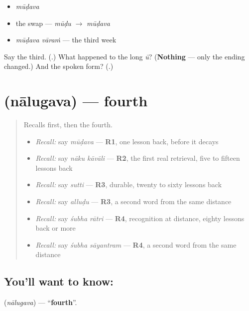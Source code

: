\begin{itemize}
\raggedright
  \item \emph{mūḍava}
  \item the swap — \emph{mūḍu} $\to$ \emph{mūḍava}
  \item \emph{mūḍava vāraṁ} — the third week
\end{itemize}

\begin{tcolorbox}[breakable,colback=teal!4,colframe=teal!35!black,title={Before you move on}]
Say the third. (\textbf{}.) What happened to the long \emph{ū}? (\textbf{Nothing} — only the ending changed.) And the spoken form? (\textbf{}.)
\end{tcolorbox}
\section[\texorpdfstring{\te{నాలుగవ} (nālugava)}{నాలుగవ (nālugava)}]{ (nālugava) — fourth}

\label{lesson:TE-C81-fourth}



\begin{quote}
Recalls first, then the fourth.

\begin{itemize}
\raggedright
  \item \emph{Recall:} say \emph{mūḍava} — \textbf{R1}, one lesson back, before it decays
  \item \emph{Recall:} say \emph{nāku kāvāli} — \textbf{R2}, the first real retrieval, five to fifteen lessons back
  \item \emph{Recall:} say \emph{sutti} — \textbf{R3}, durable, twenty to sixty lessons back
  \item \emph{Recall:} say \emph{alluḍu} — \textbf{R3}, a second word from the same distance
  \item \emph{Recall:} say \emph{śubha rātri} — \textbf{R4}, recognition at distance, eighty lessons back or more
  \item \emph{Recall:} say \emph{śubha sāyantram} — \textbf{R4}, a second word from the same distance
\end{itemize}
\end{quote}

\subsection*{You'll want to know: }
\textbf{} (\emph{nālugava}) — \textquotedblleft{}\textbf{fourth}\textquotedblright{}.


